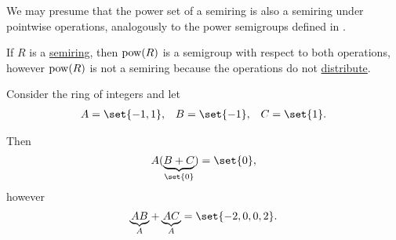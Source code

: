 \begin{example}
\begin{thmenum}
     We may presume that the power set of a semiring is also a semiring under pointwise operations, analogously to the power semigroups defined in .

    If \( R \) is a \hyperref[def:semiring]{semiring}, then \( \operatorname{pow}(R) \) is a semigroup with respect to both operations, however \( \operatorname{pow}(R) \) is not a semiring because the operations do not \hyperref[def:semiring/left_distributivity]{distribute}.

    Consider the ring of integers and let
    \begin{align*}
      A = \set{ -1, 1 },
      &&
      B = \set{ -1 },
      &&
      C = \set{ 1 }.
    \end{align*}

    Then
    \begin{equation*}
      A(\underbrace{B + C}_{\set{ 0 }})
      =
      \set{ 0 },
    \end{equation*}
    however
    \begin{equation*}
      \underbrace{AB}_{A} + \underbrace{AC}_{A}
      =
      \set{ -2, 0, 0, 2 }.
    \end{equation*}
  \end{thmenum}
\end{example}

